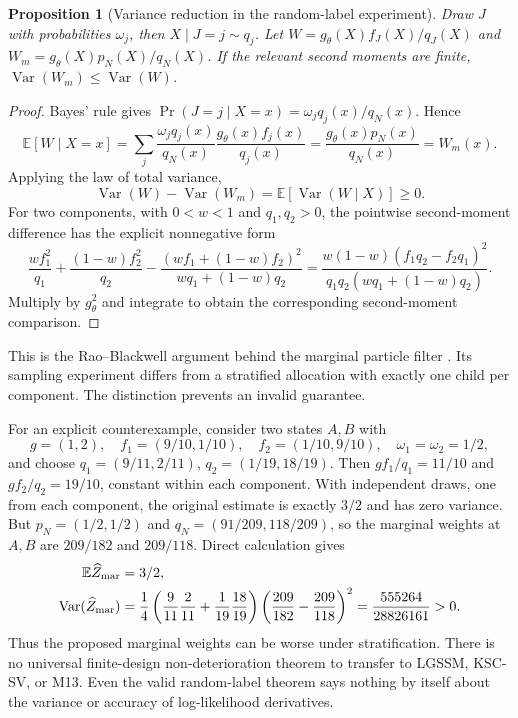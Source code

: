 \documentclass[11pt]{article}
\newtheorem{proposition}{Proposition}
\newcommand{\E}{\mathbb E}
\newcommand{\Var}{\operatorname{Var}}
\begin{document}
\begin{proposition}[Variance reduction in the random-label experiment]
\label{prop:variance}
Draw $J$ with probabilities $\omega_j$, then $X\mid J=j\sim q_j$.
Let $W=g_\theta(X)f_J(X)/q_J(X)$ and
$W_m=g_\theta(X)p_N(X)/q_N(X)$. If the relevant second moments are finite,
$\Var(W_m)\leq\Var(W)$.
\end{proposition}
\begin{proof}
Bayes' rule gives
$\Pr(J=j\mid X=x)=\omega_j q_j(x)/q_N(x)$. Hence
\begin{equation}
 \E[W\mid X=x]
 =\sum_j\frac{\omega_j q_j(x)}{q_N(x)}
                    \frac{g_\theta(x)f_j(x)}{q_j(x)}
 =\frac{g_\theta(x)p_N(x)}{q_N(x)}=W_m(x).
 \label{eq:rb-proof}
\end{equation}
Applying the law of total variance,
\begin{equation}
 \Var(W)-\Var(W_m)=\E[\Var(W\mid X)]\geq0.
 \label{eq:variance-decomposition}
\end{equation}
For two components, with $0<w<1$ and $q_1,q_2>0$, the pointwise
second-moment difference has the explicit nonnegative form
\begin{equation}
 \frac{wf_1^2}{q_1}+\frac{(1-w)f_2^2}{q_2}
 -\frac{(wf_1+(1-w)f_2)^2}{wq_1+(1-w)q_2}
 =
 \frac{w(1-w)(f_1q_2-f_2q_1)^2}
      {q_1q_2(wq_1+(1-w)q_2)} .
 \label{eq:two-component-square}
\end{equation}
Multiply by $g_\theta^2$ and integrate to obtain the corresponding
second-moment comparison.
\end{proof}

This is the Rao--Blackwell argument behind the marginal particle filter
\cite[Sec.~3, Fig.~3, Sec.~3.1 and Prop.~1]{klaas}.
Its sampling experiment differs from a stratified allocation with exactly
one child per component. The distinction prevents an invalid guarantee.

For an explicit counterexample, consider two states $A,B$ with
\[
 g=(1,2),\quad f_1=(9/10,1/10),\quad f_2=(1/10,9/10),
 \quad \omega_1=\omega_2=1/2,
\]
and choose $q_1=(9/11,2/11)$, $q_2=(1/19,18/19)$.
Then $g f_1/q_1=11/10$ and $g f_2/q_2=19/10$, constant within
each component. With independent draws, one from each component,
the original estimate is exactly $3/2$ and has zero variance.
But $p_N=(1/2,1/2)$ and $q_N=(91/209,118/209)$, so the marginal
weights at $A,B$ are $209/182$ and $209/118$. Direct calculation gives
\begin{align}
 \E\widehat Z_{\rm mar}&=3/2,\notag\\
 \Var(\widehat Z_{\rm mar})
 &=\frac14\left(\frac9{11}\frac2{11}
                    +\frac1{19}\frac{18}{19}\right)
            \left(\frac{209}{182}-\frac{209}{118}\right)^2
 =\frac{555264}{28826161}>0 .
 \label{eq:counterexample}
\end{align}
Thus the proposed marginal weights can be worse under stratification.
There is no universal finite-design non-deterioration theorem to transfer
to LGSSM, KSC-SV, or M13. Even the valid random-label theorem says nothing
by itself about the variance or accuracy of log-likelihood derivatives.
\end{document}
